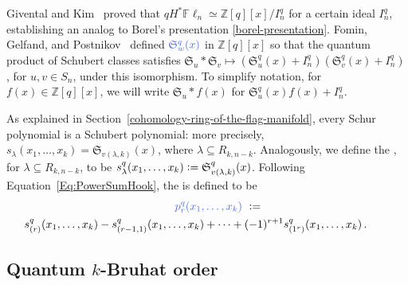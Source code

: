 \documentclass[12pt,oneside,reqno]{amsart}
\theoremstyle{definition}
\numberwithin{equation}{section}
\newcommand{\Fln}{{\mathbb F}\ell_n}
\newcommand{\ZZ}{{\mathbb Z}}
\newcommand{\frakS}{{\mathfrak S}}
\newcommand{\defcolor}[1]{{\color{RoyalBlue}#1}}
\newcommand{\demph}[1]{\defcolor{{\sl #1}}}
\begin{document}
Givental and Kim~\cite{GiventalKim}
proved that $qH^*\Fln \simeq \ZZ[q][x] / I^q_n$ for a certain ideal $I^q_n$,
establishing an analog to Borel's presentation \eqref{borel-presentation}.
Fomin, Gelfand, and Postnikov~\cite{FGP} defined \demph{quantum Schubert polynomials}
$\defcolor{\frakS^q_w(x)}$ in $\ZZ[q][x]$ so that the quantum product of
Schubert classes satisfies $\frakS_u \ast \frakS_v \mapsto (\frakS^q_u(x) + I^q_n) (\frakS^q_v(x) + I^q_n)$, for $u,v\in S_n$,
under this isomorphism.
To simplify notation, for $f(x) \in \ZZ[q][x]$, we will write
$\frakS_u \ast f(x) $ for $\frakS^q_u(x) f(x) + I^q_n$.

As explained in Section~\ref{cohomology-ring-of-the-flag-manifold},
every Schur polynomial is a Schubert polynomial:
more precisely, $s_\lambda(x_1, \ldots, x_k) = \frakS_{v(\lambda, k)}(x)$,
where $\lambda \subseteq R_{k, n-k}$.
Analogously, we define the
\demph{quantum Schur polynomial $s_\lambda^q(x_1,\dotsc,x_k)$},
for $\lambda \subseteq R_{k, n-k}$, to be 
${s_\lambda^q(x_1,\dotsc,x_k)} \vcentcolon= \frakS^q_{v(\lambda,k)}(x)$.
Following Equation~\eqref{Eq:PowerSumHook}, the \demph{quantum power sum} is defined to be
%
\begin{multline}
    \label{Eq:Q-powerSum}
    \qquad  \defcolor{p^q_r(x_1,\dotsc,x_k)}\ \vcentcolon= \\
        s^q_{(r)}(x_1,\dotsc,x_k) - s^q_{(r-1,1)}(x_1,\dotsc,x_k) +
                   \dotsb + (-1)^{r+1} s^q_{(1^r)}(x_1,\dotsc,x_k)\,.
    \qquad
\end{multline}

\subsection{Quantum $k$-Bruhat order}
\label{quantum-k-bruhat-order}
\end{document}

